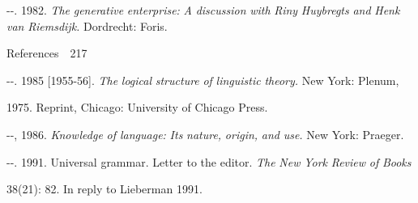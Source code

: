 \begin{listWWNumxleveli}
\item 
\begin{styleStandard}
{}-{}-. 1982. \textit{The}\textit{ }\textit{generative}\textit{ }\textit{enterprise:}\textit{ }\textit{A}\textit{ }\textit{discussion}\textit{ }\textit{with}\textit{ }\textit{Riny}\textit{ }\textit{Huybregts}\textit{ }\textit{and}\textit{ }\textit{Henk}\textit{ }\textit{van}\textit{ }\textit{Riemsdijk.}\textit{ }Dordrecht: Foris.
\end{styleStandard}


\end{listWWNumxleveli}
\clearpage\setcounter{page}{1}\begin{styleStandard}
References\ \ 217
\end{styleStandard}


\begin{listWWNumxleveli}
\item 
\begin{listWWNumxlevelii}
\item 
\begin{styleStandard}
{}-{}-. 1985 [1955-56]. \textit{The}\textit{ }\textit{logical}\textit{ }\textit{structure}\textit{ }\textit{of}\textit{ }\textit{linguistic}\textit{ }\textit{theory.}\textit{ }New York: Plenum,
\end{styleStandard}


\end{listWWNumxlevelii}
\end{listWWNumxleveli}
\begin{styleStandard}
1975. Reprint, Chicago: University of Chicago Press.
\end{styleStandard}


\begin{listWWNumxleveli}
\item 
\begin{listWWNumxlevelii}
\item 
\begin{styleStandard}
{}-{}-,{\textquotedbl} 1986. \textit{Knowledge}\textit{ }\textit{of language:}\textit{ }\textit{Its}\textit{ }\textit{nature,}\textit{ }\textit{origin,}\textit{ }\textit{and}\textit{ }\textit{use.}\textit{ }New York: Praeger.
\end{styleStandard}


\item 
\begin{styleStandard}
{}-{}-. 1991. Universal grammar. Letter to the editor. \textit{The}\textit{ }\textit{New}\textit{ }\textit{York}\textit{ }\textit{Review}\textit{ }\textit{of}\textit{ }\textit{Books}
\end{styleStandard}


\end{listWWNumxlevelii}
\end{listWWNumxleveli}
\begin{styleStandard}
38(21): 82. In reply to Lieberman 1991.
\end{styleStandard}


